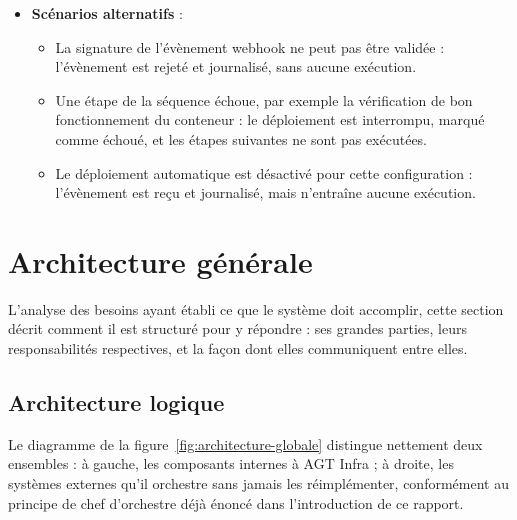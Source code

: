 \begin{itemize}
\begin{enumerate}
                construction de l'image Docker, démarrage du conteneur,
                vérification de bon fonctionnement, puis nettoyage des
                ressources temporaires.
          \item Chaque étape écrit sa progression dans un journal au fil
                de l'eau, diffusé en temps réel sur un canal dédié.
          \item L'Utilisateur suit le déploiement en direct depuis la
                console de déploiement de l'interface AGT Infra.
        \end{enumerate}
  \item \textbf{Scénarios alternatifs} :
        \begin{itemize}
          \item La signature de l'évènement webhook ne peut pas être
                validée : l'évènement est rejeté et journalisé, sans
                aucune exécution.
          \item Une étape de la séquence échoue, par exemple la
                vérification de bon fonctionnement du conteneur : le
                déploiement est interrompu, marqué comme échoué, et les
                étapes suivantes ne sont pas exécutées.
          \item Le déploiement automatique est désactivé pour cette configuration :
                l'évènement est reçu et journalisé, mais n'entraîne aucune
                exécution.
        \end{itemize}
\end{itemize}





\section{Architecture générale}

L'analyse des besoins ayant établi ce que le système doit accomplir,
cette section décrit comment il est structuré pour y répondre : ses
grandes parties, leurs responsabilités respectives, et la façon dont
elles communiquent entre elles.

\subsection{Architecture logique}

Le diagramme de la figure~\ref{fig:architecture-globale} distingue
nettement deux ensembles : à gauche, les composants internes à AGT
Infra ; à droite, les systèmes externes qu'il orchestre sans jamais les
réimplémenter, conformément au principe de chef d'orchestre déjà énoncé
dans l'introduction de ce rapport.

